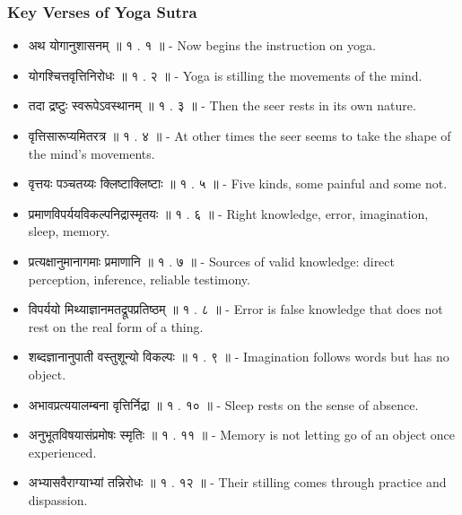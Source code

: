 \begin{frame}[fragile]\frametitle{Key Verses of Yoga Sutra}\footnotesize

    \begin{itemize}
        \item अथ योगानुशासनम् ॥ १ . १ ॥ - Now begins the instruction on yoga.
        \item योगश्चित्तवृत्तिनिरोधः ॥ १ . २ ॥ - Yoga is stilling the movements of the mind.
        \item तदा द्रष्टुः स्वरूपेऽवस्थानम् ॥ १ . ३ ॥ - Then the seer rests in its own nature.
        \item वृत्तिसारूप्यमितरत्र ॥ १ . ४ ॥ - At other times the seer seems to take the shape of the mind's movements.
        \item वृत्तयः पञ्चतय्यः क्लिष्टाक्लिष्टाः ॥ १ . ५ ॥ - Five kinds, some painful and some not.
        \item प्रमाणविपर्ययविकल्पनिद्रास्मृतयः ॥ १ . ६ ॥ - Right knowledge, error, imagination, sleep, memory.
        \item प्रत्यक्षानुमानागमाः प्रमाणानि ॥ १ . ७ ॥ - Sources of valid knowledge: direct perception, inference, reliable testimony.
        \item विपर्ययो मिथ्याज्ञानमतद्रूपप्रतिष्ठम् ॥ १ . ८ ॥ - Error is false knowledge that does not rest on the real form of a thing.
        \item शब्दज्ञानानुपाती वस्तुशून्यो विकल्पः ॥ १ . ९ ॥ - Imagination follows words but has no object.
        \item अभावप्रत्ययालम्बना वृत्तिर्निद्रा ॥ १ . १० ॥ - Sleep rests on the sense of absence.
        \item अनुभूतविषयासंप्रमोषः स्मृतिः ॥ १ . ११ ॥ - Memory is not letting go of an object once experienced.
        \item अभ्यासवैराग्याभ्यां तन्निरोधः ॥ १ . १२ ॥ - Their stilling comes through practice and dispassion.
    \end{itemize}

\end{frame}


